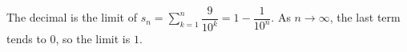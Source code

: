The decimal is the limit of $s_n=\sum_{k=1}^n\dfrac{9}{10^k}=1-\dfrac{1}{10^n}$. As $n\to\infty$, the last term tends to $0$, so the limit is $1$.
